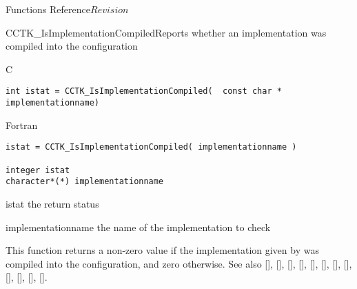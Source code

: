 \begin{cactuspart}{ Functions Reference}{}{$Revision$}
\begin{FunctionDescription}{CCTK\_IsImplementationCompiled}{Reports whether an
implementation was compiled into the configuration}
\label{CCTK-IsImplementationCompiled}
\begin{SynopsisSection}
\begin{Synopsis}{C}
\begin{verbatim}int istat = CCTK_IsImplementationCompiled(  const char * implementationname)\end{verbatim}
\end{Synopsis}
\begin{Synopsis}{Fortran}
\begin{verbatim}istat = CCTK_IsImplementationCompiled( implementationname )

integer istat
character*(*) implementationname\end{verbatim}
\end{Synopsis}
\end{SynopsisSection}
\begin{ParameterSection}
\begin{Parameter}{istat}
the return status
\end{Parameter}
\begin{Parameter}{implementationname}
the name of the implementation to check
\end{Parameter}
\end{ParameterSection}
\begin{Discussion}
This function returns a non-zero value if the implementation given by
 was compiled into the configuration, and zero
otherwise.
See also
 [\pageref{CCTK-ActivatingThorn}],
 [\pageref{CCTK-CompiledImplementation}],
 [\pageref{CCTK-CompiledThorn}],
 [\pageref{CCTK-ImplementationRequires}],
 [\pageref{CCTK-ImplementationThorn}],
 [\pageref{CCTK-ImpThornList}],
 [\pageref{CCTK-IsImplementationActive}],
 [\pageref{CCTK-IsThornActive}],
 [\pageref{CCTK-IsThornCompiled}],
 [\pageref{CCTK-NumCompiledImplementations}],
 [\pageref{CCTK-NumCompiledThorns}],
 [\pageref{CCTK-ThornImplementation}].
\end{Discussion}
\end{FunctionDescription}


\end{cactuspart}
